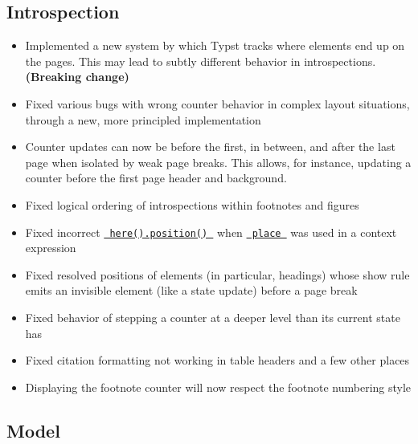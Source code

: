 \subsection{Introspection}\label{introspection}

\begin{itemize}
\tightlist
\item
  Implemented a new system by which Typst tracks where elements end up
  on the pages. This may lead to subtly different behavior in
  introspections. \textbf{(Breaking change)}
\item
  Fixed various bugs with wrong counter behavior in complex layout
  situations, through a new, more principled implementation
\item
  Counter updates can now be before the first, in between, and after the
  last page when isolated by weak page breaks. This allows, for
  instance, updating a counter before the first page header and
  background.
\item
  Fixed logical ordering of introspections within footnotes and figures
\item
  Fixed incorrect
  \href{/docs/reference/introspection/here/}{\texttt{\ here().position()\ }}
  when \href{/docs/reference/layout/place/}{\texttt{\ place\ }} was used
  in a context expression
\item
  Fixed resolved positions of elements (in particular, headings) whose
  show rule emits an invisible element (like a state update) before a
  page break
\item
  Fixed behavior of stepping a counter at a deeper level than its
  current state has
\item
  Fixed citation formatting not working in table headers and a few other
  places
\item
  Displaying the footnote counter will now respect the footnote
  numbering style
\end{itemize}

\subsection{Model}\label{model}

